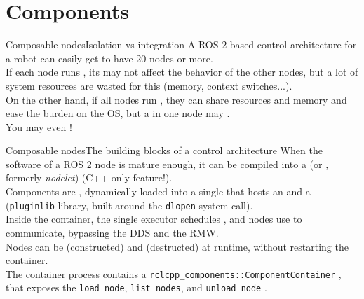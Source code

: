 
\section{Components}

\begin{frame}{Composable nodes}{Isolation vs integration}
  A ROS 2-based control architecture for a robot can easily get to have 20 nodes or more.\\
  \bigskip
  If each node runs , its  may not affect the behavior of the other nodes, but a lot of system resources are wasted for this (memory, context switches...).\\
  \bigskip
  On the other hand, if all nodes run , they can share resources and memory and ease the burden on the OS, but a  in one node may .\\
  \bigskip
  You may even !
\end{frame}
\begin{frame}{Composable nodes}{The building blocks of a control architecture}
  When the software of a ROS 2 node is mature enough, it can be compiled into a  (or , formerly \emph{nodelet}) (C++-only feature!).\\
  \bigskip
  Components are , dynamically loaded into a single  that hosts an  and a  (\texttt{pluginlib} library, built around the \texttt{dlopen} system call).\\
  \bigskip
  Inside the container, the single executor schedules , and nodes use  to communicate, bypassing the DDS and the RMW.\\
  \bigskip
  Nodes can be  (constructed) and  (destructed) at runtime, without restarting the container.\\
  \bigskip
  The container process contains a \texttt{rclcpp\_components::ComponentContainer} , that exposes the \texttt{load\_node}, \texttt{list\_nodes}, and \texttt{unload\_node} .
\end{frame}
